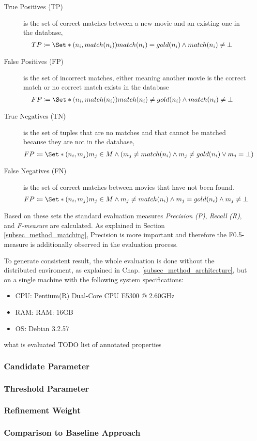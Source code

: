 \begin{description}
\item[True Positives (TP)] is the set of correct matches between a new movie and an existing one in the database,
\begin{align}
TP &\coloneqq \Set*{(n_i, match(n_i))}{match(n_i) = gold(n_i) \land match(n_i) \neq \bot}
\end{align}
\item[False Positives (FP)] is the set of incorrect matches, either meaning another movie is the correct match or no correct match exists in the database
\begin{align}
FP &\coloneqq \Set*{(n_i, match(n_i))}{match(n_i) \neq gold(n_i) \land match(n_i) \neq \bot}
\end{align}\item[True Negatives (TN)] is the set of tuples that are no matches and that cannot be matched because they are not in the database,
\begin{align}
FP &\coloneqq \Set*{(n_i, m_j)}{m_j \in M \land (m_j \neq match(n_i) \land m_j \neq gold(n_i) \lor m_j = \bot)}
\end{align}
\item[False Negatives (FN)] is the set of correct matches between movies that have not been found.
\begin{align}
FP &\coloneqq \Set*{(n_i, m_j)}{m_j \in M \land m_j \neq match(n_i) \land m_j = gold(n_i) \land m_j \neq \bot}
\end{align}
\end{description}

Based on these sets the standard evaluation measures \emph{Precision (P)}, \emph{Recall (R)}, and \emph{F-measure} are calculated.
As explained in Section \ref{subsec_method_matching}, Precision is more important and therefore the F0.5-measure is additionally observed in the evaluation process.

To generate consistent result, the whole evaluation is done without the distributed enviroment, as explained in Chap. \ref{subsec_method_architecture}, but on a single machine with the following system specifications:
\begin{itemize}
\item CPU: Pentium(R) Dual-Core  CPU E5300  @ 2.60GHz
\item RAM: RAM: 16GB
\item OS: Debian 3.2.57
\end{itemize}


what is evaluated TODO
list of annotated properties 

\subsubsection{Candidate Parameter}
\subsubsection{Threshold Parameter}
\subsubsection{Refinement Weight}
\subsubsection{Comparison to Baseline Approach}